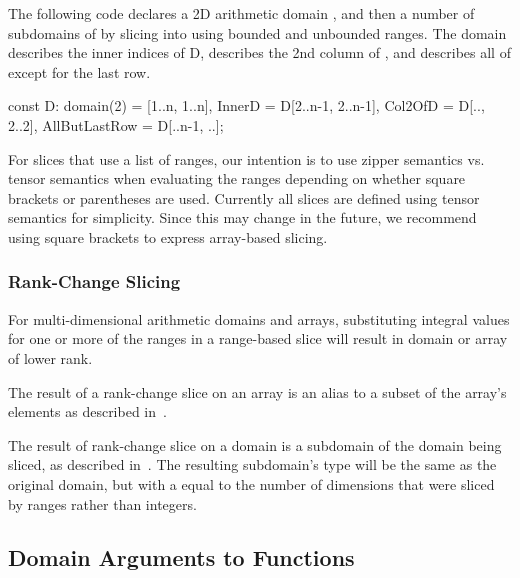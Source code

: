 \begin{example}
The following code declares a 2D arithmetic domain , and then
a number of subdomains of  by slicing into  using
bounded and unbounded ranges.  The  domain describes the
inner indices of D,  describes the 2nd column of
, and  describes all of  except
for the last row.

\begin{chapel}
const D: domain(2) = [1..n, 1..n],
      InnerD = D[2..n-1, 2..n-1],
      Col2OfD = D[.., 2..2],
      AllButLastRow = D[..n-1, ..];
\end{chapel}
\end{example}

\begin{openissue}
For slices that use a list of ranges, our intention is to use zipper
semantics vs. tensor semantics when evaluating the ranges depending on
whether square brackets or parentheses are used.  Currently all slices
are defined using tensor semantics for simplicity.  Since this may
change in the future, we recommend using square brackets to express
array-based slicing.
\end{openissue}

\subsubsection{Rank-Change Slicing}
\label{Rank_Change_Slicing}

For multi-dimensional arithmetic domains and arrays, substituting
integral values for one or more of the ranges in a range-based slice
will result in domain or array of lower rank.

The result of a rank-change slice on an array is an alias to a subset
of the array's elements as described
in~.

The result of rank-change slice on a domain is a subdomain of the
domain being sliced, as described in~.  The resulting
subdomain's type will be the same as the original domain, but with
a  equal to the number of dimensions that were sliced by
ranges rather than integers.


\subsection{Domain Arguments to Functions}
\label{Domain_Arguments_to_Functions}

